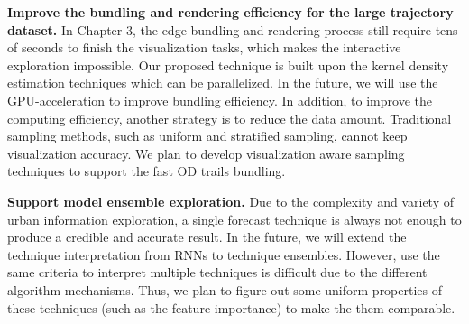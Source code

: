\textbf{Improve the bundling and rendering efficiency for the large trajectory dataset.} In Chapter 3, the edge bundling and rendering process still require tens of seconds to finish the visualization tasks, which makes the interactive exploration impossible. Our proposed technique is built upon the kernel density estimation techniques which can be parallelized. In the future, we will use the GPU-acceleration to improve bundling efficiency. In addition, to improve the computing efficiency, another strategy is to reduce the data amount. Traditional sampling methods, such as uniform and stratified sampling, cannot keep visualization accuracy. We plan to develop visualization aware sampling techniques to support the fast OD trails bundling. 

\textbf{Support model ensemble exploration.} Due to the complexity and variety of urban information exploration, a single forecast technique is always not enough to produce a credible and accurate result. In the future, we will extend the technique interpretation from RNNs to technique ensembles. However, use the same criteria to interpret multiple techniques is difficult due to the different algorithm mechanisms. Thus, we plan to figure out some uniform properties of these techniques (such as the feature importance) to make the them comparable. 